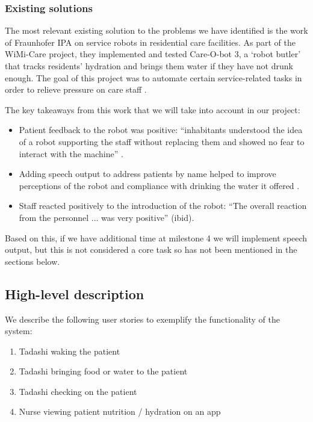 \documentclass{article}
\begin{document}
\subsubsection{Existing solutions}
The most relevant existing solution to the problems we have identified is the work of Fraunhofer IPA on service robots in residential care facilities. As part of the WiMi-Care project, they implemented and tested Care-O-bot 3, a `robot butler' that tracks residents' hydration and brings them water if they have not drunk enough. The goal of this project was to automate certain service-related tasks in order to relieve pressure on care staff \cite{fraunhofer}.

The key takeaways from this work that we will take into account in our project:
\begin{itemize}
\item Patient feedback to the robot was positive: ``inhabitants  understood  the  idea  of  a  robot  supporting  the  staff  without replacing them and showed no fear to interact with the machine'' \cite{springer}. 
\item Adding speech output to address patients by name helped to improve perceptions of the robot and compliance with drinking the water it offered \cite{ieee}. 
\item Staff reacted positively to the introduction of the robot: ``The overall reaction from the personnel ... was very positive'' (ibid). 
\end{itemize}

Based on this, if we have additional time at milestone 4 we will implement speech output, but this is not considered a core task so has not been mentioned in the sections below.

\subsection{High-level description} 
We describe the following user stories to exemplify the functionality of the system: 
\begin{enumerate}
\item Tadashi waking the patient
\item Tadashi bringing food or water to the patient
\item Tadashi checking on the patient
\item Nurse viewing patient nutrition / hydration on an app
\end{enumerate}
\end{document}
